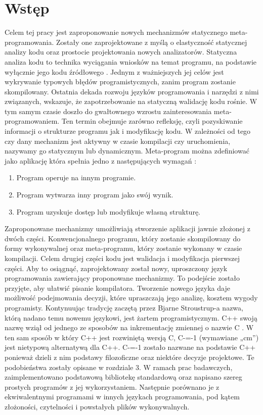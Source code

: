\section{Wstęp}
Celem tej pracy jest zaproponowanie nowych mechanizmów statycznego 
meta-programowania. Zostały one zaprojektowane z myślą o elastyczność statycznej analizy kodu oraz prostocie projektowania nowych analizatorów. 
Statyczna analiza kodu to technika wyciągania wniosków na temat programu, na podstawie wyłącznie jego kodu źródłowego \cite{survey_of_metaprograming}. Jednym z ważniejszych jej celów jest wykrywanie typowych błędów programistycznych, zanim program zostanie skompilowany. Ostatnia dekada rozwoju języków programowania i narzędzi z nimi związanych, wskazuje, że zapotrzebowanie na statyczną walidację kodu rośnie.
W tym samym czasie doszło do gwałtownego wzrostu zainteresowania meta-programowaniem. Ten termin obejmuje zarówno refleksję, czyli pozyskiwanie informacji o strukturze programu jak i modyfikację kodu. W zależności od tego czy dany mechanizm jest aktywny w czasie kompilacji czy uruchomienia, nazywamy go statycznym lub dynamicznym.
Meta-program można zdefiniować jako aplikację która spełnia jedno z następujących wymagań \cite{nielson2004principles}:
\begin{enumerate}
\item Program operuje na innym programie.
\item Program wytwarza inny program jako swój wynik.
\item Program uzyskuje dostęp lub modyfikuje własną strukturę.
\end{enumerate}
Zaproponowane mechanizmy umożliwiają stworzenie aplikacji jawnie złożonej z dwóch części. Konwencjonalnego programu, który zostanie skompilowany do formy wykonywalnej oraz meta-programu, który zostanie wykonany w czasie kompilacji. Celem drugiej części kodu jest walidacja i modyfikacja pierwszej części.
Aby to osiągnąć, zaprojektowany został nowy, uproszczony język programowania zawierający proponowane mechanizmy. To podejście zostało przyjęte, aby ułatwić pisanie kompilatora. Tworzenie nowego języka daje możliwość podejmowania decyzji, które upraszczają jego analizę, kosztem wygody programisty.
Kontynuując tradycję zaczętą przez Bjarne Stroustrup-a nazwa, którą nadano temu nowemu językowi, jest żartem programistycznym. C++ swoją nazwę wziął od jednego ze sposobów na inkrementację zmiennej o nazwie C \cite{stroustrup_com}. W ten sam sposób w który C++ jest rozwiniętą wersją C, C-=-1 (wymawiane „cm”) jest nietypową alternatywą dla C++. C-=-1 zostało nazwane na podstawie C++ ponieważ dzieli z nim podstawy filozoficzne oraz niektóre decyzje projektowe. Te podobieństwa zostały opisane w rozdziale 3.
W ramach prac badawczych, zaimplementowano podstawową bibliotekę standardową oraz napisano szereg prostych programów z jej wykorzystaniem. Następnie porównano je z ekwiwalentnymi programami w innych językach programowania, pod kątem złożoności, czytelności i powstałych plików wykonywalnych.

